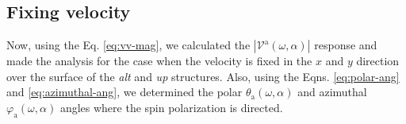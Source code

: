 \documentclass[prb,11pt,tightenlines,twocolumn,aps]{revtex4-1}
\begin{document}


\subsection{Fixing velocity} %
\label{sec:res-fixvel}



Now, using the Eq. \eqref{eq:vv-mag}, we calculated the
$|\mathcal{V}^{\mathrm{a}}(\omega,\alpha)|$ response and made the analysis for
the case when the velocity is fixed in the $x$ and $y$ direction over the
surface of the \emph{alt} and \emph{up} structures. Also, using the Eqns.
\eqref{eq:polar-ang} and \eqref{eq:azimuthal-ang}, we determined the polar
$\theta_{\mathrm{a}}(\omega,\alpha)$ and azimuthal
$\varphi_{\mathrm{a}}(\omega,\alpha)$ angles where the spin polarization is
directed.
\end{document}
